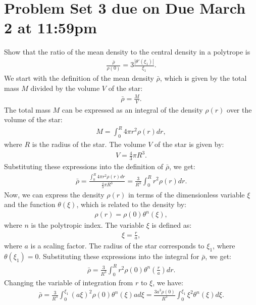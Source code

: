 \section*{Problem Set 3 due on Due March 2 at 11:59pm}
Show that the ratio of the mean density to the central density in a polytrope is
\begin{align}
    \frac{\bar{\rho}}{\rho(0)} = 3\frac{|\theta'(\xi_1)|}{\xi_1}.
\end{align}
\answer{}
We start with the definition of the mean density $\bar{\rho}$, which is given by the total mass $M$ divided by the volume $V$ of the star:
\begin{align}
    \bar{\rho} = \frac{M}{V}.
\end{align}
The total mass $M$ can be expressed as an integral of the density $\rho(r)$ over the volume of the star:
\begin{align}
    M = \int_0^R 4\pi r^2 \rho(r) dr,
\end{align}
where $R$ is the radius of the star. The volume $V$ of the star is given by:
\begin{align}
    V = \frac{4}{3}\pi R^3.
\end{align}
Substituting these expressions into the definition of $\bar{\rho}$, we get:
\begin{align}
    \bar{\rho} = \frac{\int_0^R 4\pi r^2 \rho(r) dr}{\frac{4}{3}\pi R^3} = \frac{3}{R^3} \int_0^R r^2 \rho(r) dr.
\end{align}
Now, we can express the density $\rho(r)$ in terms of the dimensionless variable $\xi$ and the function $\theta(\xi)$, which is related to the density by:
\begin{align}
    \rho(r) = \rho(0) \theta^n(\xi),
\end{align}
where $n$ is the polytropic index. The variable $\xi$ is defined as:
\begin{align}
    \xi = \frac{r}{a},
\end{align}where $a$ is a scaling factor. The radius of the star corresponds to $\xi_1$, where $\theta(\xi_1) = 0$. Substituting these expressions into the integral for $\bar{\rho}$, we get:
\begin{align}
    \bar{\rho} = \frac{3}{R^3} \int_0^R r^2 \rho(0) \theta^n\left(\frac{r}{a}\right) dr.
\end{align}
Changing the variable of integration from $r$ to $\xi$, we have:
\begin{align}
    \bar{\rho} = \frac{3}{R^3} \int_0^{\xi_1} (a\xi)^2 \rho(0) \theta^n(\xi) a d\xi = \frac{3a^3 \rho(0)}{R^3} \int_0^{\xi_1} \xi^2 \theta^n(\xi) d\xi.
\end{align}
